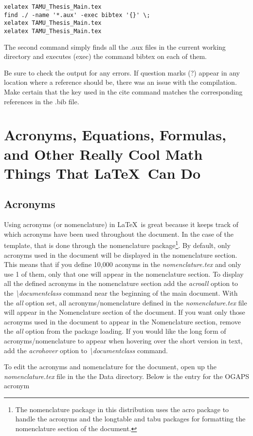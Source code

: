 \begin{verbatim}
xelatex TAMU_Thesis_Main.tex
find ./ -name '*.aux' -exec bibtex '{}' \;
xelatex TAMU_Thesis_Main.tex
xelatex TAMU_Thesis_Main.tex
\end{verbatim}

The second command simply finds all the .aux files in the current working directory and executes (exec) the command bibtex on each of them.

Be sure to check the output for any errors. If question marks (?) appear in any location where a reference should be, there was an issue with the compilation. Make certain that the key used in the cite command matches the corresponding references in the .bib file.

\section{Acronyms, Equations, Formulas, and Other Really Cool Math Things That \LaTeX\ Can Do}
\subsection{Acronyms}
Using acronyms (or nomenclature) in \LaTeX\ is great because it keeps track of which acronyms have been used throughout the document.
In the case of the template, that is done through the nomenclature package\footnote{The nomenclature package in this distribution uses the acro package to handle the acronyms and the longtable and tabu packages for formatting the nomenclature section of the document.}.
By default, only acronyms used in the document will be displayed in the nomenclature section.
This means that if you define 10,000 aconyms in the {\it nomenclature.tex} and only use 1 of them, only that one will appear in the nomenclature section.
To display all the defined acronyms in the nomenclature section add the {\it acroall} option to the {\it \textbackslash{}documentclass} command near the beginning of the main document.
With the {\it all} option set, all acronyms/nomenclature defined in the {\it nomenclature.tex} file will appear in the Nomenclature section of the document.
If you want only those acronyms used in the document to appear in the Nomenclature section, remove the {\it all} option from the package loading.
If you would like the long form of acronyms/nomenclature to appear when hovering over the short version in text, add the {\it acrohover} option to {\it \textbackslash{}documentclass} command.

To edit the acronyms and nomenclature for the document, open up the {\it nomenclature.tex} file in the the Data directory. Below is the entry for the OGAPS acronym

